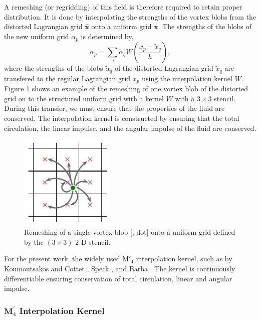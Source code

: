 A remeshing (or regridding) of this field is therefore required to retain proper distribution. It is done by interpolating the strengths of the vortex blobs from the distorted Lagrangian grid $\hat{\mathbf{x}}$ onto a uniform grid $\mathbf{x}$. The strengths of the blobs of the new uniform grid $\alpha_p$ is determined by,
	\begin{equation}
	\alpha_p = \sum_q\tilde{\alpha}_q W \left(\frac{x_p - \tilde{x}_q}{h}\right),
	\label{eq:la_remeshingKernel}
	\end{equation}
where the strengths of the blobs $\tilde{\alpha}_q$ of the distorted Lagrangian grid $\tilde{x}_q$ are transfered to the regular Lagrangian grid $x_p$ using the interpolation kernel $W$. Figure \ref{fig:interpolationGrid} shows an example of the remeshing of one vortex blob of the distorted grid on to the structured uniform grid with a kernel $W$ with a $3\times3$ stencil. During this transfer, we must ensure that the properties of the fluid are conserved. The interpolation kernel is constructed by ensuring that the total circulation, the linear impulse, and the angular impulse of the fluid are conserved. 

	\begin{figure}[!t]
	\centering
	\includegraphics[width=0.4\textwidth]{figures/lagrangian/interpolationGrid.pdf}
	\caption{Remeshing of a single vortex blob [{\color{plotGreen}{$\bullet$}}, {} dot] onto a uniform grid defined by the $\left(3\times3\right)$ 2-D stencil.}
	\label{fig:interpolationGrid}
	\end{figure}

For the present work, the widely used $\mathrm{M}'_4$ interpolation kernel, such as by Koumoutsakos and Cottet \cite{Cottet2000a}, Speck \cite{Speck2011a}, and Barba \cite{Barba2004c}. The kernel is continuously differentiable ensuring conservation of total circulation, linear and angular impulse. 

\subsubsection*{$\mathbf{M}^\prime_4$ Interpolation Kernel}

